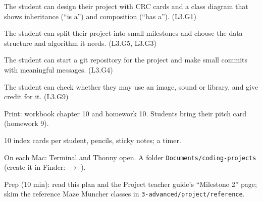 
\begin{objectives}
  \item The student can design their project with CRC cards and a class diagram that shows inheritance (\enquote{is a}) and composition (\enquote{has a}). (L3.G1)
  \item The student can split their project into small milestones and choose the data structure and algorithm it needs. (L3.G5, L3.G3)
  \item The student can start a git repository for the project and make small commits with meaningful messages. (L3.G4)
  \item The student can check whether they may use an image, sound or library, and give credit for it. (L3.G9)
\end{objectives}

\begin{materials}
  \item Print: workbook chapter 10 and homework 10. Students bring their pitch card (homework 9).
  \item 10 index cards per student, pencils, sticky notes; a timer.
  \item On each Mac: Terminal and Thonny open. A folder \texttt{Documents/coding-projects} (create it in Finder:  $\rightarrow$ ).
  \item Prep (10 min): read this plan and the Project teacher guide's \enquote{Milestone 2} page; skim the reference Maze Muncher classes in \texttt{3-advanced/project/reference}.
\end{materials}

\begin{timeplan}
\end{timeplan}

